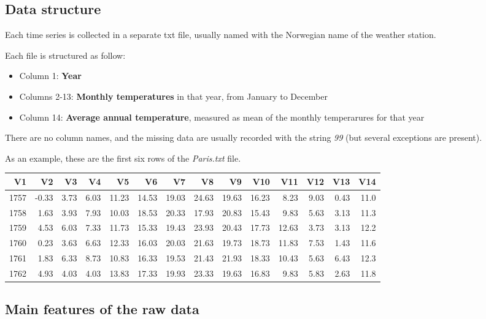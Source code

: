 \documentclass[]{article}
\begin{document}
\hypertarget{data-structure}{%
\subsection{Data structure}\label{data-structure}}

Each time series is collected in a separate txt file, usually named with
the Norwegian name of the weather station.

Each file is structured as follow:

\begin{itemize}
\item
  Column 1: \textbf{Year}
\item
  Columns 2-13: \textbf{Monthly temperatures} in that year, from January
  to December
\item
  Column 14: \textbf{Average annual temperature}, measured as mean of
  the monthly temperarures for that year
\end{itemize}

There are no column names, and the missing data are usually recorded
with the string \emph{99} (but several exceptions are present).

As an example, these are the first six rows of the \emph{Paris.txt}
file.

\begin{longtable}[]{@{}rrrrrrrrrrrrrr@{}}
\toprule
V1 & V2 & V3 & V4 & V5 & V6 & V7 & V8 & V9 & V10 & V11 & V12 & V13 &
V14\tabularnewline
\midrule
\endhead
1757 & -0.33 & 3.73 & 6.03 & 11.23 & 14.53 & 19.03 & 24.63 & 19.63 &
16.23 & 8.23 & 9.03 & 0.43 & 11.0\tabularnewline
1758 & 1.63 & 3.93 & 7.93 & 10.03 & 18.53 & 20.33 & 17.93 & 20.83 &
15.43 & 9.83 & 5.63 & 3.13 & 11.3\tabularnewline
1759 & 4.53 & 6.03 & 7.33 & 11.73 & 15.33 & 19.43 & 23.93 & 20.43 &
17.73 & 12.63 & 3.73 & 3.13 & 12.2\tabularnewline
1760 & 0.23 & 3.63 & 6.63 & 12.33 & 16.03 & 20.03 & 21.63 & 19.73 &
18.73 & 11.83 & 7.53 & 1.43 & 11.6\tabularnewline
1761 & 1.83 & 6.33 & 8.73 & 10.83 & 16.33 & 19.53 & 21.43 & 21.93 &
18.33 & 10.43 & 5.63 & 6.43 & 12.3\tabularnewline
1762 & 4.93 & 4.03 & 4.03 & 13.83 & 17.33 & 19.93 & 23.33 & 19.63 &
16.83 & 9.83 & 5.83 & 2.63 & 11.8\tabularnewline
\bottomrule
\end{longtable}

\hypertarget{main-features-of-the-raw-data}{%
\subsection{Main features of the raw
data}\label{main-features-of-the-raw-data}}
\end{document}
